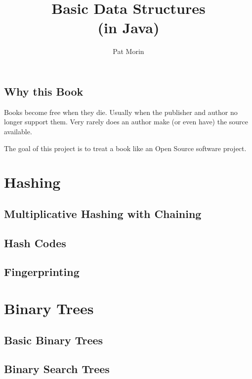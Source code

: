 \documentclass{book}
\title{Basic Data Structures\\(in Java)}
\author{Pat Morin}
\begin{document}
\begin{titlepage}
\maketitle
\thispagestyle{empty}
\end{titlepage}

\tableofcontents

\section*{Why this Book}

Books become free when they die.  Usually when the publisher and author no longer support them.  Very rarely does an author make (or even have) the source available.

The goal of this project is to treat a book like an Open Source software project.






\chapter{Hashing}
\section{Multiplicative Hashing with Chaining}
\section{Hash Codes}
\section{Fingerprinting}

\chapter{Binary Trees}
\section{Basic Binary Trees}
\section{Binary Search Trees}
\end{document}
